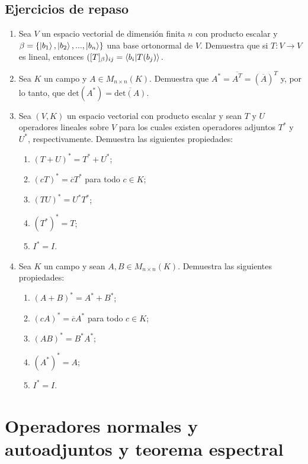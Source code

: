 \documentclass[12pt,dvipsnames]{article}
\begin{document}
\subsection{Ejercicios de repaso}
\begin{enumerate}
    \item Sea $V$ un espacio vectorial de dimensión finita $n$ con producto escalar y $\beta=\{\ket{b_1},\ket{b_2},...,\ket{b_n}\}$ una base ortonormal de $V$. Demuestra que si $T:V\to V$ es lineal, entonces $([T]_\beta)_{ij}=\braket{b_i|T(b_j)}.$
    \item Sea $K$ un campo y $A\in M_{n\times n}(K)$. Demuestra que
    $A^*=\overline{A^T}=(\overline{A})^T$ y, por lo tanto, que $\text{det}(A^*)=\overline{\text{det}(A)}$.
    \item Sea $(V,K)$ un espacio vectorial con producto escalar y sean $T$ y $U$ operadores lineales sobre $V$ para los cuales existen operadores adjuntos $T^*$ y $U^*$, respectivamente. Demuestra las siguientes propiedades:
        \begin{enumerate}[label=\alph*)]
            \item $(T+U)^*=T^*+U^*$;
            \item $(cT)^*=\overline{c}T^*$ para todo $c\in K$;
            \item $(TU)^*=U^*T^*$;
            \item $(T^*)^*=T$;
            \item $I^*=I$.
        \end{enumerate}
    \item Sea $K$ un campo y sean $A,B\in M_{n\times n}(K)$. Demuestra las siguientes propiedades:
        \begin{enumerate}[label=\alph*)]
            \item $(A+B)^*=A^*+B^*$;
            \item $(cA)^*=\overline{c}A^*$ para todo $c\in K$;
            \item $(AB)^*=B^*A^*$;
            \item $(A^*)^*=A$;
            \item $I^*=I$.
        \end{enumerate}
\end{enumerate}

\newpage
\section{Operadores normales y autoadjuntos y teorema espectral} \label{Sec:15} 
\end{document}
